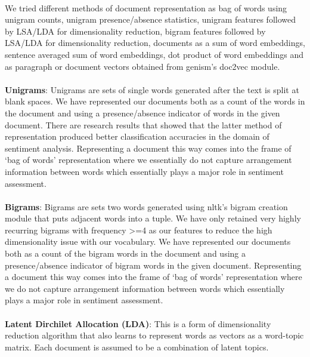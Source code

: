\documentclass[a4paper,26pt]{article}
\begin{document}
\paragraph{}
We tried different methods of document representation as bag of words using unigram counts, unigram presence/absence statistics, unigram features followed by LSA/LDA for dimensionality reduction, bigram features followed by LSA/LDA for dimensionality reduction, documents as a sum of word embeddings, sentence averaged sum of word embeddings, dot product of word embeddings and as paragraph or document vectors obtained from genism's doc2vec module.

\paragraph{}
\textbf{Unigrams}: Unigrams are sets of single words generated after the text is split at blank spaces. We have represented our documents both as a count of the words in the document and using a presence/absence indicator of words in the given document. There are research results that showed that the latter method of representation produced better classification accuracies in the domain of sentiment analysis. Representing a document this way comes into the frame of `bag of words' representation where we essentially do not capture arrangement information between words which essentially plays a major role in sentiment assessment. 

\paragraph{}
\textbf{Bigrams}: Bigrams are sets two words generated using nltk's bigram creation module that puts adjacent words into a tuple. We have only retained very highly recurring bigrams with frequency >=4 as our features to reduce the high dimensionality issue with our vocabulary. We have represented our documents both as a count of the bigram words in the document and using a presence/absence indicator of bigram words in the given document. Representing a document this way comes into the frame of `bag of words' representation where we do not capture arrangement information between words which essentially plays a major role in sentiment assessment. 

\paragraph{}
\textbf{Latent Dirchilet Allocation (LDA)}: This is a form of dimensionality reduction algorithm that also learns to represent words as vectors as a word-topic matrix. Each document is assumed to be a combination of latent topics.
\end{document}
